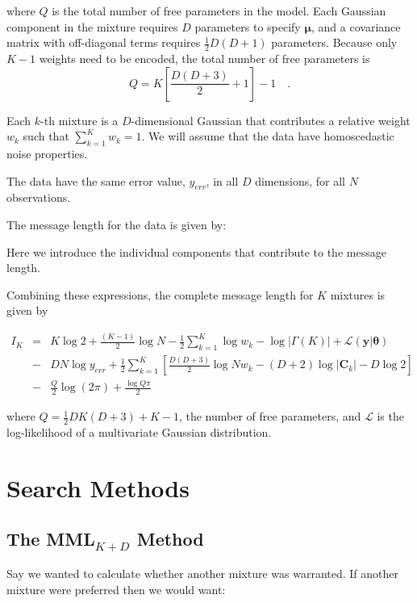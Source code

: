 \documentclass{elsarticle}
\newcommand{\vect}[1]{\boldsymbol{\mathbf{#1}}}
\def\veccov{\vect{C}}
\def\vecmean{\vect{\mu}}
\def\vectheta{\vect{\theta}}
\def\weight{w}
\def\datum{y}
\def\data{\vect{\datum}}
\begin{document}
\noindent{}where $Q$ is the total number of free parameters in the model. Each
Gaussian component in the mixture requires $D$ parameters to specify $\vecmean$,
and a covariance matrix with off-diagonal terms requires $\frac{1}{2}D(D+1)$ 
parameters. Because only $K - 1$ weights need to be encoded, the total number of free
parameters is
\begin{equation}
    Q = K\left[\frac{D(D+3)}{2} + 1\right] - 1 \quad .
    \label{eq:number-of-parameters}
\end{equation}




 Each $k$-th mixture is a $D$-dimensional Gaussian that contributes a relative weight $\weight_k$ such that $\sum_{k=1}^{K}\weight_k = 1$. We will assume that the data have homoscedastic noise properties.

The data have the same error value, $y_{err}$, in all $D$ dimensions, for all $N$ observations.

The message length for the data is given by:

Here we introduce the individual components that contribute to the message length.

Combining these expressions, the complete message length for $K$ mixtures is given by

\begin{eqnarray}
I_K & = & K\log{2} %
    + \frac{(K - 1)}{2}\log{N} - \frac{1}{2}\sum_{k=1}^{K}\log{w_k} - \log{|\Gamma(K)|} %
    +\mathcal{L}(\data|\vectheta) \nonumber \\
    & -& DN\log{y_{err}} %
   +  \frac{1}{2}\sum_{k=1}^{K}\left[\frac{D(D+3)}{2}\log{{Nw_k}} - (D + 2)\log{|\veccov_k|} - D\log{2}\right]\nonumber \\%
    &-& \frac{Q}{2}\log(2\pi) + \frac{\log{Q\pi}}{2} %
\end{eqnarray}

\noindent{}where $Q = \frac{1}{2}DK(D + 3) + K - 1$, the number of free parameters, and
$\mathcal{L}$ is the log-likelihood of a multivariate Gaussian distribution.

\section{Search Methods}

\subsection{The MML$_{K+D}$ Method}
Say we wanted to calculate whether another mixture was warranted. If another
mixture were preferred then we would want:
\end{document}
